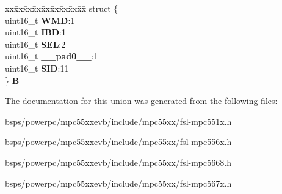 \begin{DoxyCompactItemize}
\begin{tabbing}
\end{tabbing}\item 
\mbox{\label{unionuRFRFCFR_a463cb5201ec8b530ba7244571d6df56f}} 
\begin{tabbing}
xx\=xx\=xx\=xx\=xx\=xx\=xx\=xx\=xx\=\kill
struct \{\\
\>uint16\_t {\bfseries WMD}:1\\
\>uint16\_t {\bfseries IBD}:1\\
\>uint16\_t {\bfseries SEL}:2\\
\>uint16\_t {\bfseries \_\_pad0\_\_}:1\\
\>uint16\_t {\bfseries SID}:11\\
\} {\bfseries B}\\

\end{tabbing}\end{DoxyCompactItemize}


The documentation for this union was generated from the following files\+:\begin{DoxyCompactItemize}
\item 
bsps/powerpc/mpc55xxevb/include/mpc55xx/fsl-\/mpc551x.\+h\item 
bsps/powerpc/mpc55xxevb/include/mpc55xx/fsl-\/mpc556x.\+h\item 
bsps/powerpc/mpc55xxevb/include/mpc55xx/fsl-\/mpc5668.\+h\item 
bsps/powerpc/mpc55xxevb/include/mpc55xx/fsl-\/mpc567x.\+h\end{DoxyCompactItemize}

